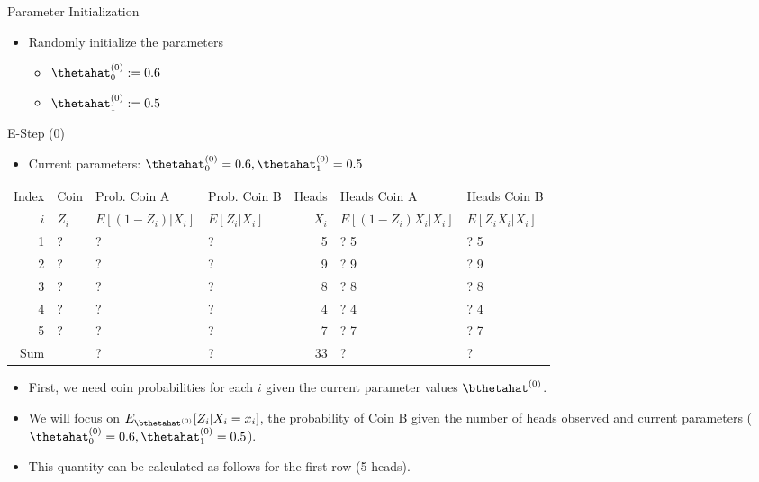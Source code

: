 \documentclass[dvipdfmx,bigger,aspectratio=169]{beamer}
\begin{document}
\begin{frame}[label={sec:orgd4a6ec0}]{Parameter Initialization}
\begin{itemize}
\item Randomly initialize the parameters
\begin{itemize}
\item \(\thetahat_{0}^{(0)} := 0.6\)
\item \(\thetahat_{1}^{(0)} := 0.5\)
\end{itemize}
\end{itemize}
\end{frame}

\begin{frame}[fragile,allowframebreaks,label=,t]{E-Step (0)}
 \begin{itemize}
\item Current parameters: \(\thetahat_{0}^{(0)} = 0.6, \thetahat_{1}^{(0)} = 0.5\)
\end{itemize}
\footnotesize
\begin{center}
\begin{tabular}{r|l|ll|r|ll|}
Index & Coin & Prob. Coin A & Prob. Coin B & Heads & Heads Coin A & Heads Coin B\\
\(i\) & \(Z_{i}\) & \(E[(1-Z_{i})\vert X_{i}]\) & \(E[Z_{i}\vert X_{i}]\) & \(X_{i}\) & \(E[(1-Z_{i}) X_{i} \vert X_{i}]\) & \(E[Z_{i} X_{i} \vert X_{i}]\)\\
\hline
1 & ? & ? & ? & 5 & ? \texttimes{} 5 & ? \texttimes{} 5\\
2 & ? & ? & ? & 9 & ? \texttimes{} 9 & ? \texttimes{} 9\\
3 & ? & ? & ? & 8 & ? \texttimes{} 8 & ? \texttimes{} 8\\
4 & ? & ? & ? & 4 & ? \texttimes{} 4 & ? \texttimes{} 4\\
5 & ? & ? & ? & 7 & ? \texttimes{} 7 & ? \texttimes{} 7\\
\hline
Sum &  & ? & ? & 33 & ? & ?\\
\end{tabular}
\end{center}
\normalsize
\begin{itemize}
\item First, we need coin probabilities for each \(i\) given the current parameter values \(\bthetahat^{(0)}\).
\end{itemize}

\newpage
\begin{itemize}
\item We will focus on \(E_{\bthetahat^{(0)}}[Z_{i} | X_{i} = x_{i}]\), the probability of Coin B given the number of heads observed and current parameters (\(\thetahat_{0}^{(0)} = 0.6, \thetahat_{1}^{(0)} = 0.5\)).
\item This quantity can be calculated as follows for the first row (5 heads).
\end{itemize}


\end{frame}
\end{document}
